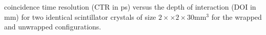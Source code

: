\label{fig:ctrvsdoi} coincidence time resolution (CTR in ps) versus the depth of interaction (DOI in mm) for two identical scintillator crystals of size $2\times\times2\times30$mm$^3$ for the wrapped and unwrapped configurations.
